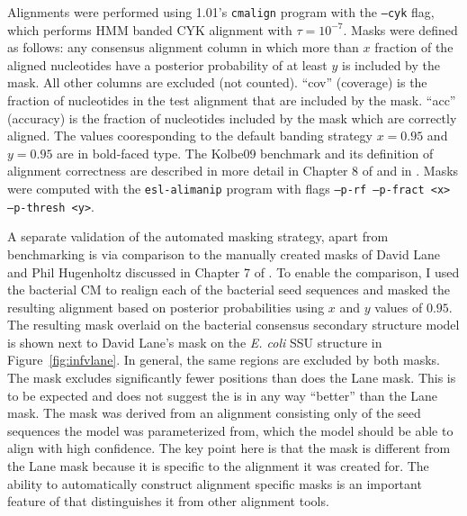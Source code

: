 \begin{table}
{  Alignments were performed using  1.01's {\tt cmalign}
  program with the {\tt --cyk} flag, which performs HMM banded CYK
  alignment with $\tau=10^{-7}$. Masks were defined as follows: any
  consensus alignment column in which more than $x$ fraction of the
  aligned nucleotides have a posterior probability of at least $y$ is
  included by the mask. All other columns are excluded (not
  counted). ``cov'' (coverage) is the fraction of nucleotides in the test
  alignment that are included by the mask. ``acc'' (accuracy) is the
  fraction of nucleotides included by the mask which are correctly
  aligned. The values cooresponding to the  default
  banding strategy $x=0.95$ and $y=0.95$ are in bold-faced type.  The
  Kolbe09 benchmark and its definition of alignment correctness are
  described in more detail in Chapter 8 of \cite{Nawrocki09b} and in
  \cite{KolbeEddy09}. Masks were computed with the {\tt esl-alimanip}
  program with flags {\tt --p-rf --p-fract <x> --p-thresh <y>}.}
\label{tbl:kolbe09-pp}
\end{table}

A separate validation of the automated masking strategy, apart from
benchmarking is via comparison to the manually created masks of David
Lane and Phil Hugenholtz discussed in Chapter 7 of \cite{Nawrocki09b}. To
enable the comparison, I used the  bacterial CM to
realign each of the bacterial seed sequences and masked the resulting
alignment based on posterior probabilities using $x$ and $y$ values of
$0.95$. The resulting mask overlaid on the  bacterial
consensus secondary structure model is shown next to David Lane's mask
on the \emph{E. coli} SSU structure in Figure~\ref{fig:infvlane}. In
general, the same regions are excluded by both masks. The
 mask excludes significantly fewer positions than does
the Lane mask.  This is to be expected and does not suggest the
 is in any way ``better'' than the Lane mask.  The
 mask was derived from an alignment consisting only of
the seed sequences the model was parameterized from, which the model should
be able to align with high confidence. The key point here is that the
 mask is different from the Lane mask because it is specific to the
alignment it was created for. The ability to automatically construct 
alignment specific masks is an important feature of  that
distinguishes it from other alignment tools. 

